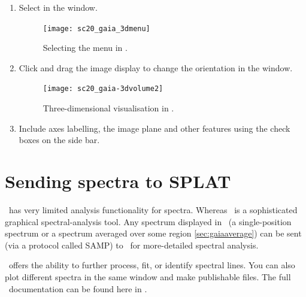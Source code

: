 \documentclass[11pt,oneside,chapters]{starlink}
\providecommand{\splatsun}{\xref{\textbf{SUN/243}}{sun243}{}}
\begin{document}
\begin{enumerate}[label=(\textbf{\arabic*})]
\item Select  in the  window.

\begin{figure}[h!]
\begin{center}
\texttt{[image: sc20\_gaia\_3dmenu]}
\caption[Selecting the Volume rendering menu in \gaia.]{\label{fig:gaia_3d}
  Selecting the  menu in \gaia.}
\end{center}
\end{figure}

\item Click and drag the image display to change the orientation in
the  window.

\begin{figure}[h!]
\begin{center}
\texttt{[image: sc20\_gaia-3dvolume2]}
\caption[Three-dimensional visualisation in \gaia.]{\label{fig:gaia_3d2}
  Three-dimensional visualisation in \gaia.}
\end{center}
\end{figure}

\item Include axes labelling, the image plane and other features using
the check boxes on the side bar.
\end{enumerate}


\section{Sending spectra to SPLAT}
\label{sec:gaiatosplat}

\gaia\ has very limited analysis functionality for spectra.  Whereas
\splat\ is a sophisticated graphical spectral-analysis tool. Any
spectrum displayed in \gaia\ (a single-position spectrum or a spectrum
averaged over some region \ref{sec:gaiaaverage}) can be sent (via a
protocol called SAMP) to \splat\ for more-detailed spectral analysis.

\splat\ offers the ability to further process, fit, or identify
spectral lines.  You can also plot different spectra in the same
window and make publishable files.  The full \splat\ documentation can
be found here in \splatsun.
\end{document}
